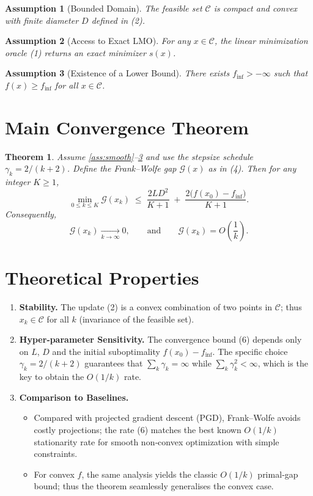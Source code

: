 \documentclass{article}
\newtheorem{theorem}{Theorem}
\newtheorem{assumption}{Assumption}
\newcommand{\C}{\mathcal{C}}
\begin{document}
\begin{assumption}[Bounded Domain]\label{ass:bounded}
The feasible set $\C$ is compact and convex with finite diameter $D$ defined in (2).
\end{assumption}

\begin{assumption}[Access to Exact LMO]\label{ass:lmo}
For any $x\in\C$, the linear minimization oracle (1) returns an exact minimizer $s(x)$.
\end{assumption}

\begin{assumption}[Existence of a Lower Bound]\label{ass:lower}
There exists $f_{\inf}>-\infty$ such that $f(x)\ge f_{\inf}$ for all $x\in\C$.
\end{assumption}

\section*{Main Convergence Theorem}
\begin{theorem}\label{thm:fw}
Assume \ref{ass:smooth}--\ref{ass:lower} and use the stepsize schedule $\gamma_{k}=2/(k+2)$.  
Define the Frank–Wolfe gap $\mathcal{G}(x)$ as in (4). Then for any integer $K\ge1$,
\[
\min_{0\le k\le K}\mathcal{G}(x_{k})
\;\le\;
\frac{2L D^{2}}{K+1}
\;+\;
\frac{2\bigl(f(x_{0})-f_{\inf}\bigr)}{K+1}.
\tag{6}
\]
Consequently,
\[
\mathcal{G}(x_{k})\xrightarrow[k\to\infty]{}0,
\qquad
\text{and}\qquad
\mathcal{G}(x_{k})=O\!\left(\frac{1}{k}\right).
\]
\end{theorem}

\section*{Theoretical Properties}
\begin{enumerate}[label=\arabic*.]
\item \textbf{Stability.} The update (2) is a convex combination of two points in $\C$; thus $x_{k}\in\C$ for all $k$ (invariance of the feasible set).
\item \textbf{Hyper‑parameter Sensitivity.} The convergence bound (6) depends only on $L$, $D$ and the initial suboptimality $f(x_{0})-f_{\inf}$. The specific choice $\gamma_{k}=2/(k+2)$ guarantees that $\sum_{k}\gamma_{k}= \infty$ while $\sum_{k}\gamma_{k}^{2}<\infty$, which is the key to obtain the $O(1/k)$ rate.
\item \textbf{Comparison to Baselines.}  
    \begin{itemize}
        \item Compared with projected gradient descent (PGD), Frank–Wolfe avoids costly projections; the rate (6) matches the best known $O(1/k)$ stationarity rate for smooth non‑convex optimization with simple constraints.
        \item For convex $f$, the same analysis yields the classic $O(1/k)$ primal‑gap bound; thus the theorem seamlessly generalises the convex case.
    \end{itemize}
\end{enumerate}
\end{document}
